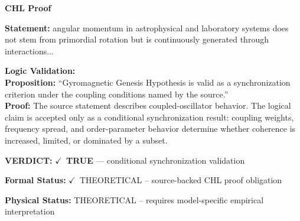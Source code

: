 \vspace{0.45em}
\noindent\textbf{CHL Proof}\par
\textbf{Statement:} angular momentum in astrophysical and laboratory systems does not stem from primordial
rotation but is continuously generated through interactions...

\textbf{Logic Validation:}\\
\textbf{Proposition:} ``Gyromagnetic Genesis Hypothesis is valid as a synchronization criterion under the
coupling conditions named by the source.''\\
\textbf{Proof:} The source statement describes coupled-oscillator behavior. The logical claim is
accepted only as a conditional synchronization result: coupling weights, frequency
spread, and order-parameter behavior determine whether coherence is increased, limited,
or dominated by a subset.

\textbf{VERDICT:} \ensuremath{\checkmark}\ \textbf{TRUE} --- conditional synchronization validation

\textbf{Formal Status:} \ensuremath{\checkmark}\ THEORETICAL -- source-backed CHL proof obligation

\textbf{Physical Status:} THEORETICAL -- requires model-specific empirical interpretation
\par\vspace{0.45em}
\par
\ifTZPDarkEdition
{}
\fi
\endgroup
\endgroup
